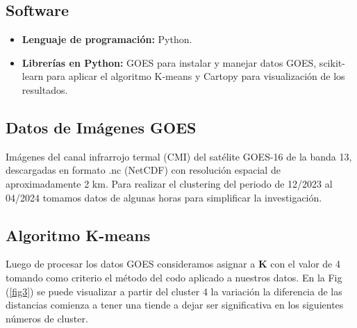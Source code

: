 \documentclass[twocolumn]{IECEjournal} %
\begin{document}
\subsection{Software}
\begin{itemize}
    \item \textbf{Lenguaje de programación:} Python.
    \item \textbf{Librerías en Python:} GOES para instalar y manejar datos GOES, scikit-learn para aplicar el algoritmo K-means y Cartopy para visualización de los resultados.
\end{itemize}

\subsection{Datos de Imágenes GOES}
Imágenes del canal infrarrojo termal (CMI) del satélite GOES-16 de la banda 13, descargadas en formato .nc (NetCDF) con resolución espacial de aproximadamente 2 km. Para realizar el clustering del periodo de 12/2023 al 04/2024 tomamos datos de algunas horas para simplificar la investigación.

\begin{table}[h]
    \centering
    \caption{Fecha y hora de los datos GOES para cada mes dentro del periodo 12/2023 al 04/2024} \label{tab2}
    \scriptsize %
\end{table}

\subsection{Algoritmo K-means}
Luego de procesar los datos GOES consideramos asignar a \textbf{K} con el valor de 4 tomando como criterio el método del codo aplicado a nuestros datos. En la Fig (\ref{fig3}) se puede visualizar a partir del cluster 4 la variación la diferencia de las distancias comienza a tener una tiende a dejar ser significativa en los siguientes números de cluster. 
\end{document}
